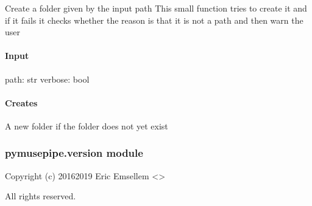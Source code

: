 \documentclass[letterpaper,10pt,english]{sphinxmanual}
\begin{document}
\begin{fulllineitems}
\label{\detokenize{api/pymusepipe:pymusepipe.util_pipe.safely_create_folder}}
\pysigstartsignatures
{}
\pysigstopsignatures
\sphinxAtStartPar
Create a folder given by the input path This small function tries to create it
and if it fails it checks whether the reason is that it is not a path and then warn the user


\paragraph{Input}
\label{\detokenize{api/pymusepipe:id176}}
\sphinxAtStartPar
path: str
verbose: bool


\paragraph{Creates}
\label{\detokenize{api/pymusepipe:id177}}
\sphinxAtStartPar
A new folder if the folder does not yet exist

\end{fulllineitems}



\subsubsection{pymusepipe.version module}
\label{\detokenize{api/pymusepipe:module-pymusepipe.version}}\label{\detokenize{api/pymusepipe:pymusepipe-version-module}}
\sphinxAtStartPar
Copyright (c) 2016\sphinxhyphen{}2019 Eric Emsellem \textless{}\textgreater{}

\sphinxAtStartPar
All rights reserved.
\end{document}
